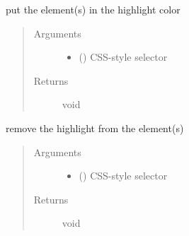 \documentclass[a4paper,12pt,english]{sphinxmanual}
\begin{document}
\begin{fulllineitems}
\label{\detokenize{viewer/parameters:BIMDataViewer.highlight}}
put the element(s) in the highlight color
\begin{quote}\begin{description}
\item[{Arguments}] \leavevmode\begin{itemize}
\item {} 
 () \textendash{} CSS-style selector

\end{itemize}

\item[{Returns}] \leavevmode
void

\end{description}\end{quote}

\end{fulllineitems}



\begin{fulllineitems}
\label{\detokenize{viewer/parameters:BIMDataViewer.dehighlight}}
remove the highlight from the element(s)
\begin{quote}\begin{description}
\item[{Arguments}] \leavevmode\begin{itemize}
\item {} 
 () \textendash{} CSS-style selector

\end{itemize}

\item[{Returns}] \leavevmode
void

\end{description}\end{quote}

\end{fulllineitems}
\end{document}
